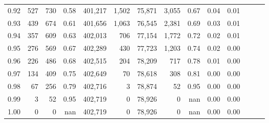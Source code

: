 \begin{tabular}{rrrrrrrrrrrrrr}
0.92 &    527 &    730 &  0.58 &  401,217 &    1,502 &  75,871 &   3,055 &  0.67 &  0.04 &      0.01 \\
0.93 &    439 &    674 &  0.61 &  401,656 &    1,063 &  76,545 &   2,381 &  0.69 &  0.03 &      0.01 \\
0.94 &    357 &    609 &  0.63 &  402,013 &      706 &  77,154 &   1,772 &  0.72 &  0.02 &      0.01 \\
0.95 &    276 &    569 &  0.67 &  402,289 &      430 &  77,723 &   1,203 &  0.74 &  0.02 &      0.00 \\
0.96 &    226 &    486 &  0.68 &  402,515 &      204 &  78,209 &     717 &  0.78 &  0.01 &      0.00 \\
0.97 &    134 &    409 &  0.75 &  402,649 &       70 &  78,618 &     308 &  0.81 &  0.00 &      0.00 \\
0.98 &     67 &    256 &  0.79 &  402,716 &        3 &  78,874 &      52 &  0.95 &  0.00 &      0.00 \\
0.99 &      3 &     52 &  0.95 &  402,719 &        0 &  78,926 &       0 &   nan &  0.00 &      0.00 \\
1.00 &      0 &      0 &   nan &  402,719 &        0 &  78,926 &       0 &   nan &  0.00 &      0.00 \\
\bottomrule
\end{tabular}
